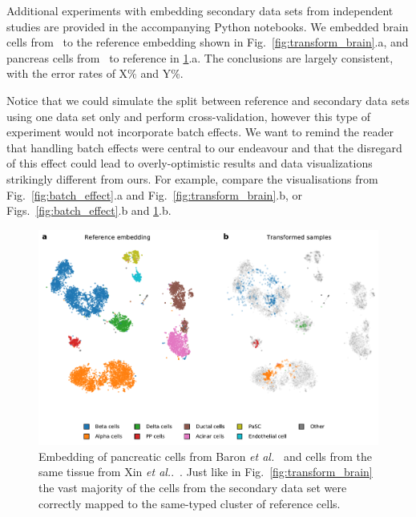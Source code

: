 \documentclass[runningheads]{llncs}
\newcommand{\etal}{\textit{et al.}}
\begin{document}
Additional experiments with embedding secondary data sets from independent
studies are provided in the accompanying Python notebooks. We embedded brain
cells from~\cite{} to the reference embedding shown in
Fig.~\ref{fig:transform_brain}.a, and pancreas cells from~\cite{} to reference
in \ref{fig:transform_pancreas}.a. The conclusions are largely consistent, with the error rates 
of X\% and Y\%. 

Notice that we could simulate the split between reference and secondary data
sets using one data set only and perform cross-validation, however this type of experiment
would not incorporate batch effects. We want to remind the reader that handling
batch effects were central to our endeavour and that the disregard of this effect
could lead to overly-optimistic results and data visualizations strikingly different from ours. For example,
compare the visualisations from Fig.~\ref{fig:batch_effect}.a and
Fig.~\ref{fig:transform_brain}.b, or Figs.~\ref{fig:batch_effect}.b and
\ref{fig:transform_pancreas}.b.




\begin{figure}[htb]
\includegraphics[width=\textwidth]{figures/transform_pancreas.pdf}
\caption{Embedding of pancreatic cells from Baron \etal~\cite{baron2016} and
cells from the same tissue from Xin \etal.~\cite{xin2016}. Just like in
Fig.~\ref{fig:transform_brain} the vast majority of the cells from the secondary
data set were correctly mapped to the same-typed cluster of reference
cells.}\label{fig:transform_pancreas}
\end{figure}
\end{document}
